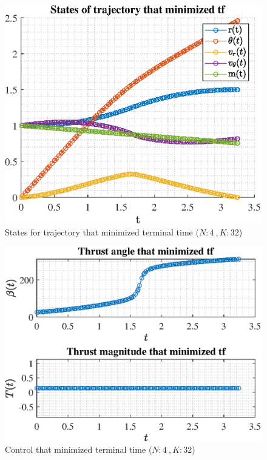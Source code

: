 \documentclass[]{article}
\begin{document}
	\begin{figure}
		\centering
		\includegraphics[scale=0.75]{states_N4_K32_C3_tf.eps}
		\caption{States for trajectory that minimized terminal time (\(N:4\ , K:32\))}
		\label{fig:states_N4_K32_C3_tf}
	\end{figure}
	\begin{figure}
		\centering
		\includegraphics[scale=0.75]{control_N4_K32_C3_tf.eps}
		\caption{Control that minimized terminal time (\(N:4\ , K:32\))}
		\label{fig:control_N4_K32_C3_tf}
	\end{figure}
\end{document}
